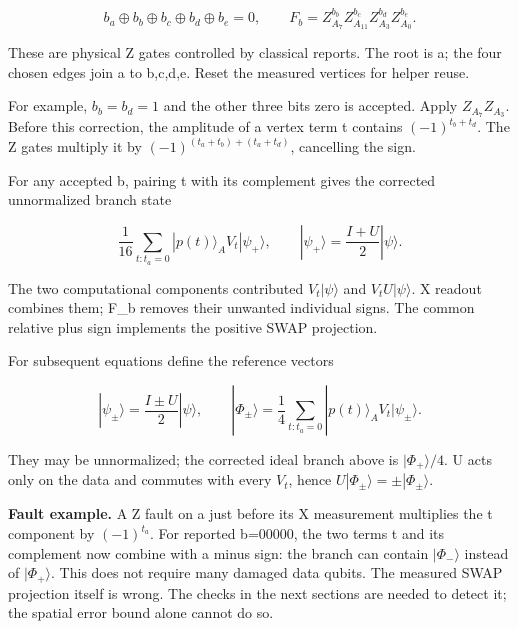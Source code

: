\documentclass[11pt]{article}
\begin{document}
\[
b_a\oplus b_b\oplus b_c\oplus b_d\oplus b_e=0,\qquad
F_b=Z_{A_7}^{b_b}Z_{A_{11}}^{b_c}Z_{A_3}^{b_d}Z_{A_0}^{b_e}.
\]

These are physical Z gates controlled by classical reports. The root is a; the four chosen edges join a to b,c,d,e. Reset the measured vertices for helper reuse.

\begin{center}\begin{minipage}{\linewidth}

\end{minipage}\end{center}

For example, \(b_b=b_d=1\) and the other three bits zero is accepted. Apply \(Z_{A_7}Z_{A_3}\). Before this correction, the amplitude of a vertex term t contains \((-1)^{t_b+t_d}\). The Z gates multiply it by \((-1)^{(t_a+t_b)+(t_a+t_d)}\), cancelling the sign.

For any accepted b, pairing t with its complement gives the corrected unnormalized branch state

\[
\frac1{16}\sum_{t:t_a=0}|p(t)\rangle_A V_t|\psi_+\rangle,
\qquad |\psi_+\rangle=\frac{I+U}{2}|\psi\rangle.
\]

The two computational components contributed \(V_t|\psi\rangle\) and \(V_tU|\psi\rangle\). X readout combines them; F\_b removes their unwanted individual signs. The common relative plus sign implements the positive SWAP projection.

For subsequent equations define the reference vectors

\[
|\psi_\pm\rangle=\frac{I\pm U}{2}|\psi\rangle,\qquad
|\Phi_\pm\rangle=\frac14\sum_{t:t_a=0}|p(t)\rangle_A V_t|\psi_\pm\rangle.
\]

They may be unnormalized; the corrected ideal branch above is \(|\Phi_+\rangle/4\). U acts only on the data and commutes with every \(V_t\), hence \(U|\Phi_\pm\rangle=\pm|\Phi_\pm\rangle\).

\textbf{Fault example.} A Z fault on a just before its X measurement multiplies the t component by \((-1)^{t_a}\). For reported b=00000, the two terms t and its complement now combine with a minus sign: the branch can contain \(|\Phi_-\rangle\) instead of \(|\Phi_+\rangle\). This does not require many damaged data qubits. The measured SWAP projection itself is wrong. The checks in the next sections are needed to detect it; the spatial error bound alone cannot do so.
\end{document}
